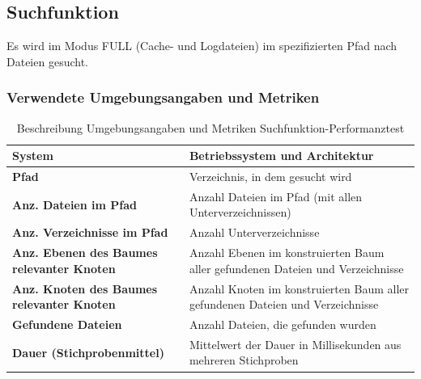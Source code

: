 \documentclass[a4paper,12pt]{report}
\begin{document}
    \subsection{Suchfunktion}\label{subsec:testduchfuhrung}
    Es wird im Modus FULL (Cache- und Logdateien) im spezifizierten Pfad nach Dateien gesucht.

    \subsubsection{Verwendete Umgebungsangaben und Metriken}\label{subsubsec:search-perftest-metrics-title}
    \begin{table}[h!]
        \centering
        \setlength{\leftmargini}{0.8cm}
        \begin{tabular}{|p{7cm}|p{7cm}|}
            \hline
            \textbf{System}                                            & Betriebssystem und Architektur                                                 \\ \hline
            \textbf{Pfad}                                              & Verzeichnis, in dem gesucht wird                                               \\ \hline
            \textbf{Anz. Dateien im Pfad}                              & Anzahl Dateien im Pfad (mit allen Unterverzeichnissen)                         \\ \hline
            \textbf{Anz. Verzeichnisse im Pfad}                        & Anzahl Unterverzeichnisse                                                      \\ \hline
            \textbf{Anz. Ebenen \newline des Baumes relevanter Knoten} & Anzahl Ebenen im konstruierten Baum aller gefundenen Dateien und Verzeichnisse \\ \hline
            \textbf{Anz. Knoten \newline des Baumes relevanter Knoten} & Anzahl Knoten im konstruierten Baum aller gefundenen Dateien und Verzeichnisse \\ \hline
            \textbf{Gefundene Dateien}                                 & Anzahl Dateien, die gefunden wurden                                            \\ \hline
            \textbf{Dauer (Stichprobenmittel)}                         & Mittelwert der Dauer in Millisekunden aus mehreren Stichproben                 \\ \hline
        \end{tabular}
        \caption{Beschreibung Umgebungsangaben und Metriken Suchfunktion-Performanztest}\label{tab:perf-search-metrics}
    \end{table}
\end{document}
